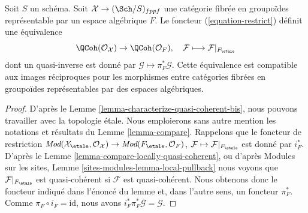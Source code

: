 \begin{lemma}
\label{lemma-compare-quasi-coherent}
Soit $S$ un schéma. Soit $\mathcal{X} \to (\Sch/S)_{fppf}$ une catégorie
fibrée en groupoïdes représentable par un espace algébrique $F$.
Le foncteur (\ref{equation-restrict}) définit une équivalence
$$
\QCoh(\mathcal{O}_\mathcal{X}) \to \QCoh(\mathcal{O}_F),\quad
\mathcal{F} \longmapsto \mathcal{F}|_{F_\etale}
$$
dont un quasi-inverse est donné par $\mathcal{G} \mapsto \pi_F^*\mathcal{G}$.
Cette équivalence est compatible aux images réciproques pour les morphismes entre
catégories fibrées en groupoïdes représentables par des espaces algébriques.
\end{lemma}

\begin{proof}
D'après le Lemme \ref{lemma-characterize-quasi-coherent-bis}, nous pouvons travailler avec
la topologie \'etale. Nous emploierons sans autre mention les notations et résultats du
Lemme \ref{lemma-compare}.
Rappelons que le foncteur de restriction
$\textit{Mod}(\mathcal{X}_\etale, \mathcal{O}_\mathcal{X}) \to
\textit{Mod}(F_\etale, \mathcal{O}_F)$,
$\mathcal{F} \mapsto \mathcal{F}|_{F_\etale}$ est donné par $i_F^*$. D'après le
Lemme \ref{lemma-compare-locally-quasi-coherent}, ou d'après
Modules sur les sites, Lemme \ref{sites-modules-lemma-local-pullback}
nous voyons que $\mathcal{F}|_{F_\etale}$ est quasi-cohérent si
$\mathcal{F}$ est quasi-cohérent.
Nous obtenons donc le foncteur indiqué dans l'énoncé du
lemme et, dans l'autre sens, un foncteur $\pi_F^*$.
Comme $\pi_F \circ i_F = \text{id}$, nous avons
$i_F^*\pi_F^*\mathcal{G} = \mathcal{G}$.


\end{proof}
